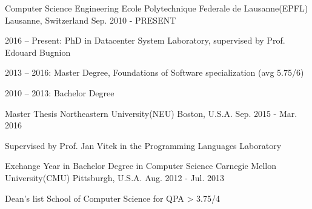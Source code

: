 


\begin{cventries}


\cventry
{Computer Science Engineering} %
{Ecole Polytechnique Federale de Lausanne(EPFL)} %
{Lausanne, Switzerland} %
{Sep. 2010 - PRESENT} %
{ %
\begin{cvitems}
\item {2016 -- Present: PhD in Datacenter System Laboratory, supervised by Prof. Edouard Bugnion}
\item {2013 -- 2016: Master Degree, Foundations of Software specialization (avg 5.75/6)}
\item {2010 -- 2013: Bachelor Degree}
\end{cvitems}
}

\cventry
{Master Thesis}
{Northeastern University(NEU)}
{Boston, U.S.A.}
{Sep. 2015 - Mar. 2016}
{
	\begin{cvitems}
	\item{Supervised by Prof. Jan Vitek in the Programming Languages Laboratory}
	\end{cvitems}
}

\cventry
{Exchange Year in Bachelor Degree in Computer Science}
{Carnegie Mellon University(CMU)}
{Pittsburgh, U.S.A.}
{Aug. 2012 - Jul. 2013}
{
	\begin{cvitems}
	\item{Dean's list School of Computer Science for QPA > 3.75/4}
	\end{cvitems}
}



\end{cventries}